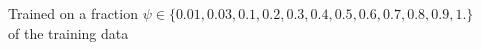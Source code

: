 \documentclass[preview]{standalone}
\begin{document}
Trained on a fraction $\psi \in \{0.01, 0.03, 0.1, 0.2, 0.3, 0.4, 0.5, 0.6, 0.7, 0.8, 0.9, 1.\}$ \\
                of the training data\\
\end{document}
